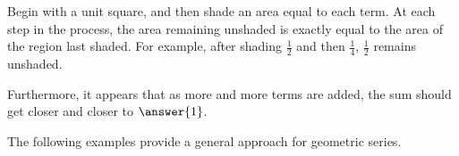 \documentclass[nooutcomes]{ximera}
\begin{document}
\begin{problem}
\begin{problem}
\begin{problem}
Begin with a unit square, and then shade an area equal to each term.  At each step in the process, the area remaining unshaded is exactly equal to the area of the region last shaded.  For example, after shading $\frac{1}{2}$ and then $\frac{1}{4}$, $\frac{1}{2}$ remains unshaded.  

Furthermore, it appears that as more and more terms are added, the sum should get closer and closer to $\answer{1}$.  

The following examples provide a general approach for geometric series.  
\end{problem}
\end{problem}
\end{problem}
\end{document}
